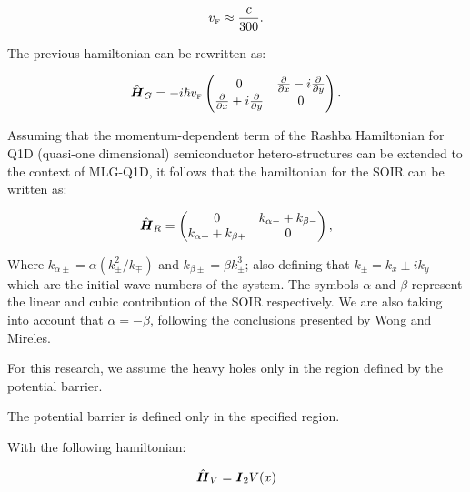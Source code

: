     \begin{equation}
        \label{eq:vF}
        v_{\mbox{\tiny F}} \approx \frac{c}{300}.
    \end{equation}

    The previous hamiltonian can be rewritten as:

\begin{equation}
    \label{eq:pristineGrapheneMatrix}
    \hat{\mbox{\boldmath $H$}}_G = -i\hbar v_{\mbox{\tiny F}}
    \begin{pmatrix}
        0 & \frac{\partial}{\partial x}- i\frac{\partial}{\partial y}\\
        \frac{\partial}{\partial x}+ i\frac{\partial}{\partial y} & 0
    \end{pmatrix}.
\end{equation}

    Assuming that the momentum-dependent term of the Rashba Hamiltonian for Q1D (quasi-one dimensional) semiconductor hetero-structures can be extended to the context of MLG-Q1D\cite{RDiago2010, Serna2019}, it follows that the hamiltonian for the SOIR can be written as:

    \begin{equation}
        \label{eq:SOIRHamiltonian}
        \hat{\mbox{\boldmath $H$}}_R =
        \begin{pmatrix}
            0 & k_{\alpha-} + k_{\beta-}\\
            k_{\alpha+} + k_{\beta+} & 0
        \end{pmatrix},
    \end{equation}

    \noindent Where $k_{\alpha\pm} = \alpha\left(k_{\pm}^2/k_{\mp}\right)$ and $k_{\beta\pm} = \beta k_{\pm}^3$; also defining that $k_{\pm}=k_x\pm i k_y$ which are the initial wave numbers of the system.
    The symbols $\alpha$ and $\beta$ represent the linear and cubic contribution of the SOIR respectively.
    We are also taking into account that $\alpha = -\beta$, following the conclusions presented by Wong and Mireles\cite{WongUNAM2005}.

    For this research, we assume the heavy holes only in the region defined by the potential barrier.

    The potential barrier is defined only in the specified region.


    With the following hamiltonian:

    \begin{equation}
        \label{eq:potentialBarrierHamiltonian}
        \hat{\mbox{\boldmath $H$}}_V=\mbox{\boldmath $I$}_2 V(x)
    \end{equation}

